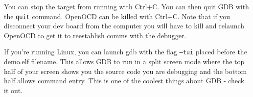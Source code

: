 You can stop the target from running with Ctrl+C. You can then quit GDB with the \texttt{quit} command. OpenOCD can be killed with Ctrl+C. Note that if you disconnect your dev board from the computer you will have to kill and relaunch OpenOCD to get it to reestablish comms with the debugger.

If you're running Linux, you can launch gdb with the flag \texttt{--tui} placed before the demo.elf filename. This allows GDB to run in a split screen mode where the top half of your screen shows you the source code you are debugging and the bottom half allows command entry. This is one of the coolest things about GDB - check it out.
